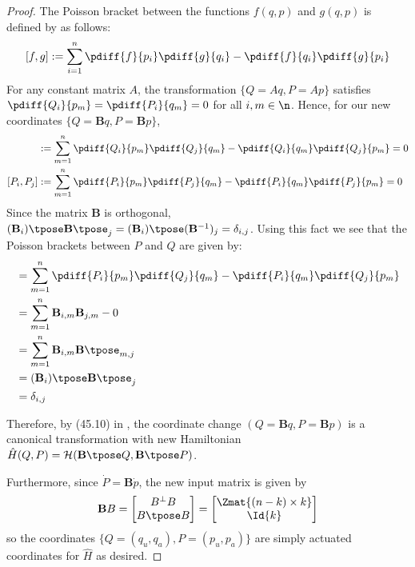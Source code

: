 \begin{proof}
    The Poisson bracket between the functions \(f(q,p)\) and \(g(q,p)\) is defined by
    \cite{landau_mechanics} as follows:
    \[
        [f,g] := \sum \limits_{i=1}^n \pdiff{f}{p_i}\pdiff{g}{q_i} - 
                \pdiff{f}{q_i}\pdiff{g}{p_i}
    \]
    For any constant matrix \(A\), the transformation
    \(\{Q = Aq, P = Ap\}\) satisfies
    \(\pdiff{Q_i}{p_m} = \pdiff{P_i}{q_m} = 0\) for all 
    \(i,m \in \n\).
    Hence, for our new coordinates \(\{Q = \mathbf{B}q, P = \mathbf{B}p\}\),
    \begin{align*}
        [Q_i,Q_j] &:= \sum\limits_{m = 1}^n \pdiff{Q_i}{p_m}\pdiff{Q_j}{q_m} - 
        \pdiff{Q_i}{q_m}\pdiff{Q_j}{p_m} = 0 \\
        [P_i,P_j] &:= \sum\limits_{m=1}^n \pdiff{P_i}{p_m}\pdiff{P_j}{q_m} -
        \pdiff{P_i}{q_m}\pdiff{P_j}{p_m} = 0
    \end{align*}
    Since the matrix \(\mathbf{B}\) is orthogonal,
    \((\mathbf{B}_i)\tpose \mathbf{B}\tpose_j = (\mathbf{B}_i)\tpose (\mathbf{B}^{-1})_j = \delta_{i,j}\). Using this
    fact we see that the Poisson brackets between \(P\) and \(Q\) are given by:
    \begin{align*}
        [P_i,Q_j] &= \sum\limits_{m=1}^n\pdiff{P_i}{p_m}\pdiff{Q_j}{q_m}
        - \pdiff{P_i}{q_m}\pdiff{Q_j}{p_m} \\
                  &= \sum\limits_{m=1}^n \mathbf{B}_{i,m}\mathbf{B}_{j,m} - 0 \\
                  &= \sum\limits_{m=1}^n \mathbf{B}_{i,m}\mathbf{B}\tpose_{m,j} \\
                  &= (\mathbf{B}_i)\tpose \mathbf{B}\tpose_j \\
                  &= \delta_{i,j}
    \end{align*}

    Therefore, by (45.10) in \cite{landau_mechanics}, the coordinate change 
    \((Q = \mathbf{B}q, P = \mathbf{B}p)\) is a canonical transformation with
    new Hamiltonian 
    \(\hat{H}(Q,P) = \mathcal{H}(\mathbf{B}\tpose Q,\mathbf{B}\tpose P)\).

    Furthermore, since \(\dot{P} = \mathbf{B}\dot{p}\), the new input matrix is
    given by 
    \[
        \mathbf{B}B = \begin{bmatrix}
            B^\perp B \\
            B\tpose B \\
        \end{bmatrix} = 
        \begin{bmatrix}
            \Zmat{(n-k)\times k} \\
            \Id{k}
        \end{bmatrix}
    \]
    so the coordinates \(\{Q = (q_u,q_a), P = (p_u,p_a)\}\) are simply actuated coordinates for 
    \(\hat{H}\) as desired.
\end{proof}

